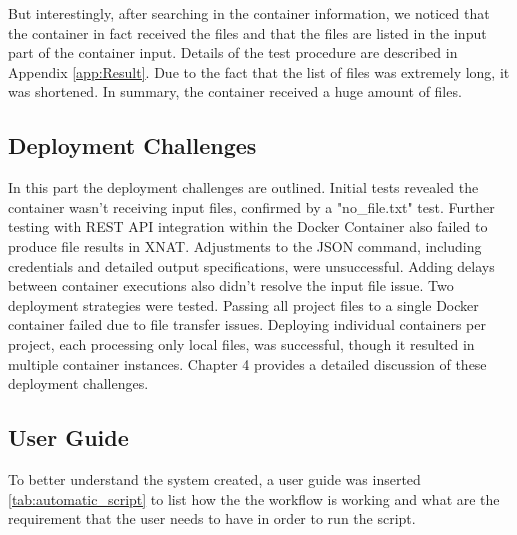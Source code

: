 \normalsize
But interestingly, after searching in the container information, we noticed that the container in fact received the files and that the files are listed in the input part of the container input. 
Details of the test procedure are described in Appendix 
\autoref{app:Result}. Due to the fact that the list of files was extremely long, it was shortened. In summary, the container received a huge amount of files.
\normalsize
\subsection{Deployment Challenges}
 In this part the deployment challenges are outlined. Initial tests revealed the container wasn't receiving input files, confirmed by a "no\_file.txt" test. Further testing with REST API integration within the Docker Container also failed to produce file results in XNAT. Adjustments to the JSON command, including credentials and detailed output specifications, were unsuccessful. Adding delays between container executions also didn't resolve the input file issue.
Two deployment strategies were tested. Passing all project files to a single Docker container failed due to file transfer issues. Deploying individual containers per project, each processing only local files, was successful, though it resulted in multiple container instances. Chapter 4 provides a detailed discussion of these deployment challenges. 


\normalsize



\subsection{User Guide}
To better understand the system created, a user guide was inserted \autoref{tab:automatic_script} to list how the the workflow is working and what are the requirement that the user needs to have in order to run the script. 

